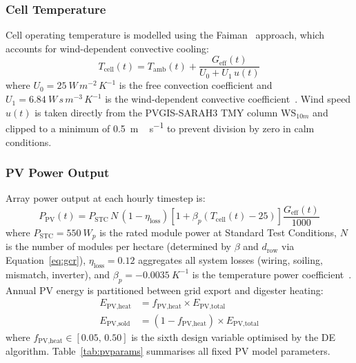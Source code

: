 \subsubsection{Cell Temperature}

\hspace{1cm}Cell operating temperature is modelled using the
Faiman~\citep{faiman2008} approach, which accounts for
wind-dependent convective cooling:
\begin{equation}
    T_{\text{cell}}(t) = T_{\text{amb}}(t)
        + \frac{G_{\text{eff}}(t)}{U_0 + U_1\,u(t)}
    \label{eq:tcell}
\end{equation}
where $U_0 = \SI{25}{W\,m^{-2}\,K^{-1}}$ is the free convection
coefficient and $U_1 = \SI{6.84}{W\,s\,m^{-3}\,K^{-1}}$ is the
wind-dependent convective coefficient~\citep{faiman2008}.
Wind speed $u(t)$ is taken directly from the PVGIS-SARAH3 TMY
column WS$_{10m}$ and clipped to a minimum of
\SI{0.5}{m\,s^{-1}} to prevent division by zero in calm
conditions.

\subsubsection{PV Power Output}

\hspace{1cm}Array power output at each hourly timestep is:
\begin{equation}
    P_{\text{PV}}(t) = P_{\text{STC}}\,N\,(1-\eta_{\text{loss}})
        \left[1 + \beta_p\left(T_{\text{cell}}(t) - 25\right)\right]
        \frac{G_{\text{eff}}(t)}{1000}
    \label{eq:ppv}
\end{equation}
where $P_{\text{STC}} = \SI{550}{W_p}$ is the rated module power
at Standard Test Conditions, $N$ is the number of modules per
hectare (determined by $\beta$ and $d_{\text{row}}$ via
Equation~\ref{eq:gcr}), $\eta_{\text{loss}} = 0.12$ aggregates
all system losses (wiring, soiling, mismatch, inverter), and
$\beta_p = \SI{-0.0035}{K^{-1}}$ is the temperature power
coefficient~\citep{jinko}. Annual PV energy is partitioned
between grid export and digester heating:
\begin{align}
    E_{\text{PV,heat}} &= f_{\text{PV,heat}} \times E_{\text{PV,total}} \\
    E_{\text{PV,sold}} &= (1 - f_{\text{PV,heat}}) \times E_{\text{PV,total}}
    \label{eq:pvpartition}
\end{align}
where $f_{\text{PV,heat}} \in [0.05,\,0.50]$ is the sixth design
variable optimised by the DE algorithm. Table~\ref{tab:pvparams}
summarises all fixed PV model parameters.

